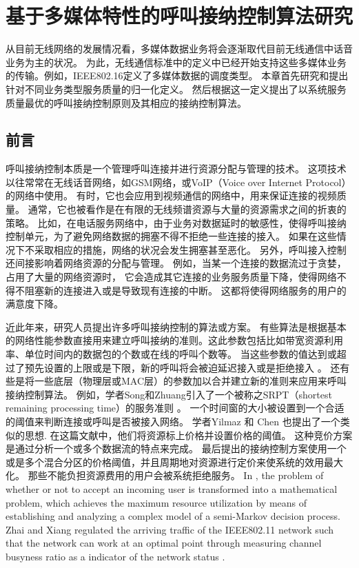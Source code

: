 \graphicspath{ {../figures/}}
\chapter{基于多媒体特性的呼叫接纳控制算法研究}
\label{chap_cacop}

从目前无线网络的发展情况看，多媒体数据业务将会逐渐取代目前无线通信中话音业务为主的状况。
为此，无线通信标准中的定义中已经开始支持这些多媒体业务的传输。例如，IEEE802.16定义了多媒体数据的调度类型。
本章首先研究和提出针对不同业务类型服务质量的归一化定义。
然后根据这一定义提出了以系统服务质量最优的呼叫接纳控制原则及其相应的接纳控制算法。

\section{前言}
呼叫接纳控制本质是一个管理呼叫连接并进行资源分配与管理的技术。
这项技术以往常常在无线话音网络，如GSM网络，或VoIP（Voice over Internet Protocol）的网络中使用\cite{Perros1996}\cite{Mase2004}。
有时，它也会应用到视频通信的网络中，用来保证连接的视频质量\cite{Systems_2001}\cite{Y-G-Fang.TVT.2002}\cite{Y-Xiao.IEICE.TC.2001}。
通常，它也被看作是在有限的无线频谱资源与大量的资源需求之间的折衷的策略。
比如，在电话服务网络中，由于业务对数据延时的敏感性，使得呼叫接纳控制单元，为了避免网络数据的拥塞不得不拒绝一些连接的接入。
如果在这些情况下不采取相应的措施，网络的状况会发生拥塞甚至恶化。
另外，呼叫接入控制还间接影响着网络资源的分配与管理。
例如，当某一个连接的数据流过于贪婪，占用了大量的网络资源时，
它会造成其它连接的业务服务质量下降，使得网络不得不阻塞新的连接进入或是导致现有连接的中断。
这都将使得网络服务的用户的满意度下降。

近此年来，研究人员提出许多呼叫接纳控制的算法或方案。
有些算法是根据基本的网络性能参数直接用来建立呼叫接纳的准则。这此参数包括比如带宽资源利用率、单位时间内的数据包的个数或在线的呼叫个数等。
当这些参数的值达到或超过了预先设置的上限或是下限，新的呼叫将会被迫延迟接入或是拒绝接入\cite{Y-Qian.TWC.2006} \cite{G-Djuka.TELSIK.2007}。
还有些是将一些底层（物理层或MAC层）的参数加以合并建立新的准则来应用来呼叫接纳控制算法。
例如，学者Song和Zhuang引入了一个被称之SRPT（shortest remaining processing time）的服务准则 \cite{Song2009}。
一个时间窗的大小被设置到一个合适的阈值来判断连接或呼叫是否被接入网络。
学者Yilmaz 和 Chen 也提出了一个类似的思想\cite{Yilmax2009}.
在这篇文献中，他们将资源标上价格并设置价格的阈值。
这种竞价方案是通过分析一个或多个数据流的特点来完成。
最后提出的接纳控制方案使用一个或是多个混合分区的价格阈值，并且周期地对资源进行定价来使系统的效用最大化。
那些不能负担资源费用的用户会被系统拒绝服务。
In \cite{Zhai2005,Ni2009}, the problem of whether or not to accept an incoming user is transformed into a mathematical problem, which achieves the maximum resource utilization by means of establishing and analyzing a complex model of a semi-Markov decision process. 
Zhai and Xiang regulated the arriving traffic of the IEEE802.11 network such that the network can work at an optimal point through measuring channel busyness ratio as a indicator of the network status \cite{Zhai_Chen_Fang_2006}.

